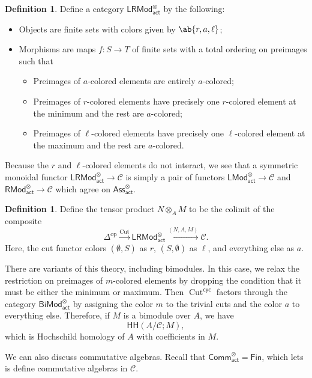 \documentclass[10pt, oneside]{memoir}
\theoremstyle{definition}
\newtheorem{defn}[thm]{Definition}
\theoremstyle{remark}
\theoremstyle{plain}
\theoremstyle{definition}
\theoremstyle{remark}
\newcommand{\mc}[1]{\mathcal{#1}}
\newcommand{\on}[1]{\operatorname{#1}}
\newcommand{\ms}[1]{\mathsf{#1}}
\newcommand{\1}{\mathbf{1}}
\newcommand{\2}{\mathbf{2}}
\newcommand{\3}{\mathbf{3}}
\newcommand{\HH}{\ms{HH}}
\DeclareMathOperator{\op}{op}
\begin{document}
\begin{defn}
    Define a category $\ms{LRMod}_{\ms{act}}^{\otimes}$ by the following:
    \begin{itemize}
        \item Objects are finite sets with colors given by $\ab\{r, a, \ell \}$;
        \item Morphisms are maps $f \colon S \to T$ of finite sets with a total ordering on preimages such that
        \begin{itemize}
            \item Preimages of $a$-colored elements are entirely $a$-colored;
            \item Preimages of $r$-colored elements have precisely one $r$-colored element at the minimum and the rest are $a$-colored;
            \item Preimages of $\ell$-colored elements have precisely one $\ell$-colored element at the maximum and the rest are $a$-colored.
        \end{itemize}
    \end{itemize}
\end{defn}

Because the $r$ and $\ell$-colored elements do not interact, we see that a symmetric monoidal functor $\ms{LRMod}_{\ms{act}}^{\otimes} \to \mc{C}$ is simply a pair of functors $\ms{LMod}_{\ms{act}}^{\otimes}\to \mc{C}$ and $\ms{RMod}_{\ms{act}}^{\otimes} \to \mc{C}$ which agree on $\ms{Ass}_{\ms{act}}^{\otimes}$.

\begin{defn}
    Define the tensor product $N \otimes_A M$ to be the colimit of the composite
    \[ \Delta^{\op} \xrightarrow{\on{Cut}} \ms{LRMod}_{\ms{act}}^{\otimes} \xrightarrow{(N, A, M)} \mc{C}. \]
    Here, the cut functor colors $(\emptyset, S)$ as $r$, $(S, \emptyset)$ as $\ell$, and everything else as $a$.
\end{defn}

There are variants of this theory, including bimodules. In this case, we relax the restriction on preimages of $m$-colored elements by dropping the condition that it must be either the minimum or maximum. Then $\on{Cut}^{\ms{cyc}}$ factors through the category $\ms{BiMod}_{\ms{act}}^{\otimes}$ by assigning the color $m$ to the trivial cuts and the color $a$ to everything else. Therefore, if $M$ is a bimodule over $A$, we have
\[ \HH(A/\mc{C}; M), \]
which is Hochschild homology of $A$ with coefficients in $M$.

We can also discuss commutative algebras. Recall that $\ms{Comm}_{\ms{act}}^{\otimes} = \ms{Fin}$, which lets is define commutative algebras in $\mc{C}$. 
\end{document}
